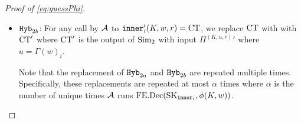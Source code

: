 \begin{proof}[Proof of \cref{eq:guessPhi}]
\begin{itemize}
		\item $\texttt{Hyb}_{2b}$: For any call by $\mathcal{A}$ to $\texttt{inner}_i'(K, w, r) = \text{CT}$, we replace $\text{CT}$ with
		with $\text{CT}'$ where $\text{CT}'$ is the output of $\text{Sim}_2$ with input ${\Pi^{(K, u, r)}}'$ where $u = \Gamma(w)_i$.

		Note that the replacement of $\texttt{Hyb}_{2a}$ and $\texttt{Hyb}_{2b}$ are repeated multiple times.
		Specifically, these replacements are repeated at most $\alpha$ times where $\alpha$ is the number
		of unique times $\mathcal{A}$ runs $\text{FE.Dec}(\text{SK}_{\texttt{inner}_i}, \phi(K, w))$.




\end{itemize}
\end{proof}
